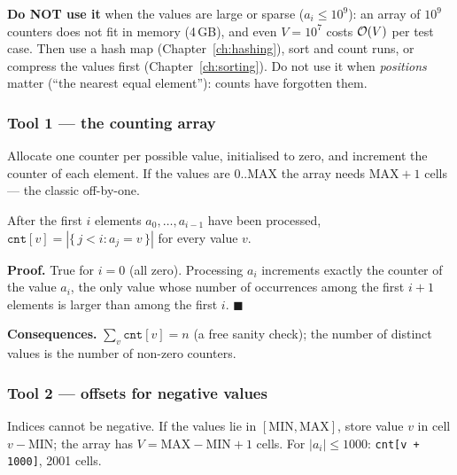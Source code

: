 \textbf{Do NOT use it} when the values are large or sparse ($a_i \le 10^9$): an array of $10^9$ counters does not fit in memory (4\,GB), and even $V = 10^7$ costs $\mathcal{O}(V)$ per test case. Then use a hash map (Chapter~\ref{ch:hashing}), sort and count runs, or compress the values first (Chapter~\ref{ch:sorting}). Do not use it when \emph{positions} matter (``the nearest equal element''): counts have forgotten them.

\subsubsection*{Tool 1 --- the counting array}

Allocate one counter per possible value, initialised to zero, and increment the counter of each element. If the values are $0..\text{MAX}$ the array needs $\text{MAX} + 1$ cells --- the classic off-by-one.

\begin{invariantbox}
After the first $i$ elements $a_0, \dots, a_{i-1}$ have been processed, $\texttt{cnt}[v] = |\{\, j < i : a_j = v \,\}|$ for every value $v$.

\textbf{Proof.} True for $i = 0$ (all zero). Processing $a_i$ increments exactly the counter of the value $a_i$, the only value whose number of occurrences among the first $i+1$ elements is larger than among the first $i$. \hfill$\blacksquare$

\textbf{Consequences.} $\sum_v \texttt{cnt}[v] = n$ (a free sanity check); the number of distinct values is the number of non-zero counters.
\end{invariantbox}

\subsubsection*{Tool 2 --- offsets for negative values}

Indices cannot be negative. If the values lie in $[\text{MIN}, \text{MAX}]$, store value $v$ in cell $v - \text{MIN}$; the array has $V = \text{MAX} - \text{MIN} + 1$ cells. For $|a_i| \le 1000$: \texttt{cnt[v + 1000]}, 2001 cells.

\begin{diagrambox}
\end{diagrambox}

